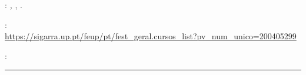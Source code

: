 
\thispagestyle{empty}

\hfill

\vfill

\noindent\myName:
\textit{\myTitle,} \mySubTitle, \myTime.

\medskip
{}: \\
\url{https://sigarra.up.pt/feup/pt/fest_geral.cursos_list?pv_num_unico=200405299}

\medskip
{}: \\

\vspace{1cm}
\hrule
\bigskip

